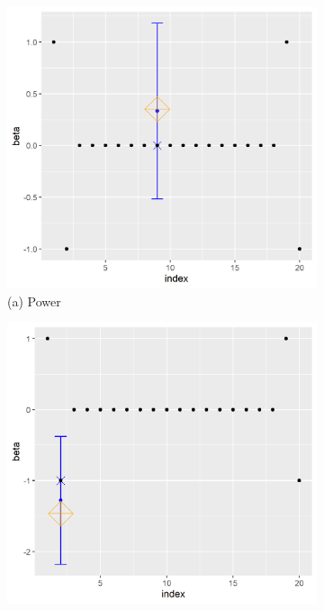 \captionsetup[subfigure]{labelformat=empty}
\begin{figure}[ht!]
\centering
\begin{subfigure}[b]{.32\columnwidth} 
    \includegraphics[width=\columnwidth]{../../plot/split_10_1_1.png}
    \caption{(a) Power}
\end{subfigure}
\hfill
\centering
\begin{subfigure}[b]{.32\columnwidth} 
    \includegraphics[width=\columnwidth]{../../plot/p1_10_1_1.png}

\end{subfigure}
\end{figure}
